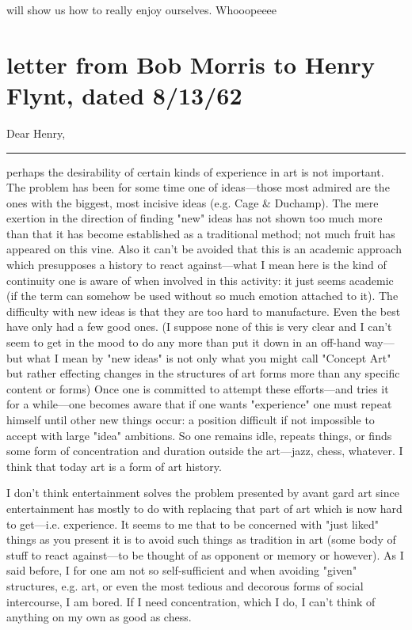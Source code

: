 \documentclass[10pt,twoside]{memoir}
\newcommand{\gap}{\plainbreak{2}}
\begin{document}
\begin{enumerate}
{\begin{enumerate}

will show us how to really enjoy ourselves. Whooopeeee 


\clearpage

\section{letter from Bob Morris to Henry Flynt, dated 8/13/62}

Dear Henry, 

\gap

perhaps the desirability of certain kinds of experience in art is not 
important. The problem has been for some time one of ideas---those most 
admired are the ones with the biggest, most incisive ideas (e.g. Cage \& 
Duchamp). The mere exertion in the direction of finding "new" ideas has 
not shown too much more than that it has become established as a 
traditional method; not much fruit has appeared on this vine. Also it can't be 
avoided that this is an academic approach which presupposes a history to 
react against---what I mean here is the kind of continuity one is aware of 
when involved in this activity: it just seems academic (if the term can 
somehow be used without so much emotion attached to it). The difficulty 
with new ideas is that they are too hard to manufacture. Even the best have 
only had a few good ones. (I suppose none of this is very clear and I can't 
seem to get in the mood to do any more than put it down in an off-hand 
way---but what I mean by "new ideas" is not only what you might call
"Concept Art" but rather effecting changes in the structures of art forms 
more than any specific content or forms) Once one is committed to attempt 
these efforts---and tries it for a while---one becomes aware that if one wants 
"experience" one must repeat himself until other new things occur: a 
position difficult if not impossible to accept with large "idea" ambitions. So 
one remains idle, repeats things, or finds some form of concentration and 
duration outside the art---jazz, chess, whatever. I think that today art is a 
form of art history. 

I don't think entertainment solves the problem presented by avant gard art 
since entertainment has mostly to do with replacing that part of art which is 
now hard to get---i.e. experience. It seems to me that to be concerned with 
"just liked" things as you present it is to avoid such things as tradition in art 
(some body of stuff to react against---to be thought of as opponent or 
memory or however). As I said before, I for one am not so self-sufficient and 
when avoiding "given" structures, e.g. art, or even the most tedious and 
decorous forms of social intercourse, I am bored. If I need concentration, 
which I do, I can't think of anything on my own as good as chess. 


\end{enumerate}}
\end{enumerate}
\end{document}

